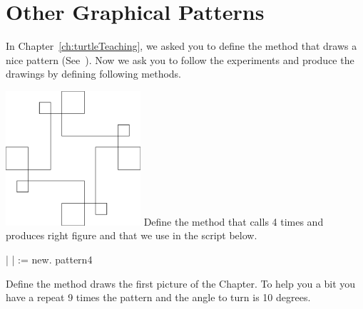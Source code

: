 \section{Other Graphical Patterns}
In Chapter~\ref{ch:turtleTeaching}, we asked you to define the method  that draws a nice pattern (See~). Now we ask you to follow the experiments and produce the drawings by defining following methods. 





\begin{exofigwithsize}[0.5]{\includegraphics[width=5cm]{compCompleteThing}}
Define the method  that calls 4 times  and produces right figure and that we use  in the script below.

\begin{nalltt}
| \caro |
\caro := \Turtle new.
\caro pattern4
\end{nalltt}
\end{exofigwithsize}

\begin{exonofig}
Define the method   draws the first picture of the Chapter. To help you a bit you have a repeat 9 times the pattern and the angle to turn is 10 degrees.

\end{exonofig}

